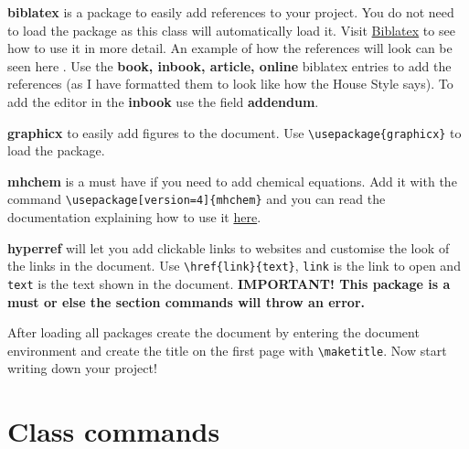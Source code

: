 \documentclass[headers1]{MSEHouseStyle}
\begin{document}
\begin{numlist}
\item \textbf{biblatex} is a package to easily add references to your project. You do not need to load the package as this class will automatically load it. Visit \href{https://www.overleaf.com/learn/latex/Biblatex_citation_styles}{Biblatex} to see how to use it in more detail. An example of how the references will look can be seen here \cite{einstein,knuthwebsite,dirac,knuth-fa}. Use the \textbf{book, inbook, article, online} biblatex entries to add the references (as I have formatted them to look like how the House Style says). To add the editor in the \textbf{inbook} use the field \textbf{addendum}.
\item \textbf{graphicx} to easily add figures to the document. Use \verb|\usepackage{graphicx}| to load the package.
\item \textbf{mhchem} is a must have if you need to add chemical equations. Add it with the command \verb|\usepackage[version=4]{mhchem}| and you can read the documentation explaining how to use it \href{https://ctan.org/pkg/mhchem}{here}.
\item \textbf{hyperref} will let you add clickable links to websites and customise the look of the links in the document. Use \verb|\href{link}{text}|, \verb|link| is the link to open and \verb|text| is the text shown in the document. \textbf{IMPORTANT! This package is a must or else the section commands will throw an error.}
\end{numlist}

After loading all packages create the document by entering the document environment and create the title on the first page with \verb|\maketitle|. Now start writing down your project!

\section{Class commands}
\end{document}
